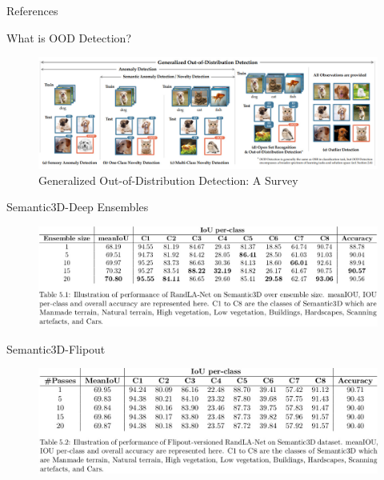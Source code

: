 \documentclass[aspectratio=169]{beamer}
\begin{document}

\begin{frame}{References}
    
    

\end{frame}

\begin{frame}[noframenumbering]{What is OOD Detection?}
    \begin{figure}
        \centering
        \includegraphics[scale=0.3]{images/OOD_ex_new.jpg}
        \caption{Generalized Out-of-Distribution Detection: A Survey}
        \label{fig:my_label}
    \end{figure}
\end{frame}

\begin{frame}[noframenumbering]{Semantic3D-Deep Ensembles}
    \begin{figure}
        \centering
        \includegraphics[scale=0.4]{images/Semantic3d_DE.jpg}
    \end{figure}
\end{frame}
\begin{frame}[noframenumbering]{Semantic3D-Flipout}
    \begin{figure}
        \centering
        \includegraphics[scale=0.4]{images/Semantic3d_Fout.jpg}
    \end{figure}
\end{frame}
\end{document}
